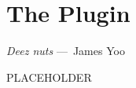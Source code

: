 
\chapter{The \toolname{} Plugin}
\label{ch:Tool}

\begin{epigraph}
  \emph{
    Deez nuts
    } ---~James Yoo
\end{epigraph}

PLACEHOLDER

\endinput
